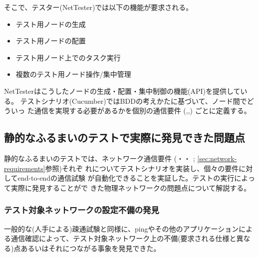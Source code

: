 そこで、テスター(NetTester)では以下の機能が要求される。
\begin{itemize}
 \item テスト用ノードの生成
 \item テスト用ノードの配置
 \item テスト用ノード上でのタスク実行
 \item 複数のテスト用ノード操作/集中管理
\end{itemize}
NetTesterはこうしたノードの生成・配置・集中制御の機能(API)を提供している。
テストシナリオ(Cucumber)ではBDDの考えかたに基づいて、ノード間でどういっ
た通信を実現する必要があるかを個別の通信要件
(,,)
ごとに定義する。

  \subsection{静的なふるまいのテストで実際に発見できた問題点}
  \label{sec:statictest-founded-issues}

静的なふるまいのテストでは、\yo ネットワーク通信要件
(・・
; \ref{sec:network-requirements}参照)それぞ
れについてテストシナリオを実装し、個々の要件に対してend-to-endの通信試験
が自動化できることを実証した。テストの実行によって実際に発見することがで
きた物理ネットワークの問題点について解説する。

   \subsubsection{テスト対象ネットワークの設定不備の発見}


一般的な(人手による)疎通試験と同様に、pingやその他のアプリケーションによ
る通信確認によって、テスト対象ネットワーク上の不備(要求される仕様と異な
る)点あるいはそれにつながる事象を発見できた。

